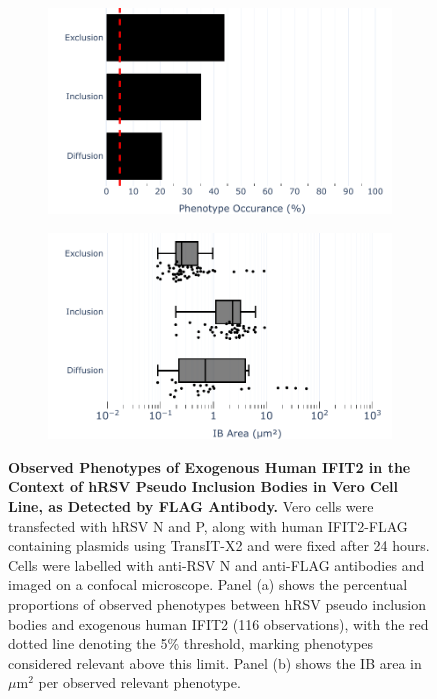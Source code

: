 \begin{figure}
    \begin{subfigure}{0.495\textwidth}
        \caption{}
        \includegraphics[width=1\linewidth]{09. Chapter 4/Figs/01. pIB/03. IFIT2/04. IFIT2-FLAG/03. FLAG/01. bar_hi2f_hnhp.pdf}
    \end{subfigure}
    \begin{subfigure}{0.495\textwidth}
        \caption{}
        \includegraphics[width=1\linewidth]{09. Chapter 4/Figs/01. pIB/03. IFIT2/04. IFIT2-FLAG/03. FLAG/02. box_hi2f_hnhp.pdf}
    \end{subfigure}
    \caption[Observed Phenotypes of Exogenous Human IFIT2 in the Context of hRSV Pseudo Inclusion Bodies in Vero Cell Line, as Detected by FLAG Antibody.]{\textbf{Observed Phenotypes of Exogenous Human IFIT2 in the Context of hRSV Pseudo Inclusion Bodies in Vero Cell Line, as Detected by FLAG Antibody.} Vero cells were transfected with hRSV N and P, along with human IFIT2-FLAG containing plasmids using TransIT-X2 and were fixed after 24 hours. Cells were labelled with anti-RSV N and anti-FLAG antibodies and imaged on a confocal microscope. Panel (a) shows the percentual proportions of observed phenotypes between hRSV pseudo inclusion bodies and exogenous human IFIT2 (116 observations), with the red dotted line denoting the 5\% threshold, marking phenotypes considered relevant above this limit. Panel (b) shows the IB area in \(\mu \mbox{m}^2\) per observed relevant phenotype.}
    \label{fig:Observed Phenotypes of Exogenous Human IFIT2 in the Context of hRSV Pseudo Inclusion Bodies in Vero Cell Line, as Detected by FLAG Antibody}
\end{figure}

